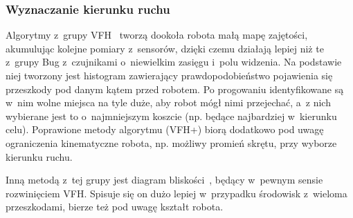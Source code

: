 
\subsubsection{Wyznaczanie kierunku ruchu}

Algorytmy z~grupy VFH~\cite{borenstein1991vector} tworzą dookoła robota małą mapę zajętości, akumulując kolejne
pomiary z~sensorów, dzięki czemu działają lepiej niż te z~grupy Bug z~czujnikami
o~niewielkim zasięgu i~polu widzenia. Na podstawie niej tworzony jest histogram
zawierający prawdopodobieństwo pojawienia się przeszkody pod danym kątem przed robotem.
Po progowaniu identyfikowane są w~nim wolne miejsca na tyle duże, aby robot mógł
nimi przejechać, a~z nich wybierane jest to o~najmniejszym koszcie (np. będące najbardziej
w~kierunku celu). Poprawione metody algorytmu (VFH+) biorą dodatkowo pod uwagę
ograniczenia kinematyczne robota, np. możliwy promień skrętu, przy wyborze kierunku ruchu.

Inną metodą z~tej grupy jest diagram bliskości~\cite{minguez2004nearness}, będący 
w~pewnym sensie rozwinięciem VFH.
Spisuje się on dużo lepiej w~przypadku środowisk z~wieloma przeszkodami, bierze też
pod uwagę kształt robota.

